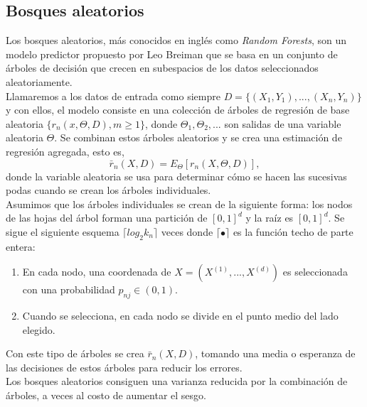 \subsection{Bosques aleatorios}
Los bosques aleatorios, más conocidos en inglés como \textit{Random Forests}, son un modelo predictor propuesto por Leo Breiman que se basa en un conjunto de  árboles de decisión que crecen en subespacios de los datos seleccionados aleatoriamente. \cite{biau2012analysis}\\
Llamaremos a los datos de entrada como siempre $D = \lbrace (X_1,Y_1),...,(X_n,Y_n) \rbrace$ y con ellos, el modelo consiste en una colección de árboles de regresión de base aleatoria $\lbrace r_n(x, \Theta ,D),m\geq1 \rbrace$, donde $\Theta_1, \Theta_2,...$ son salidas de una variable aleatoria $\Theta$. Se combinan estos árboles aleatorios y se crea una estimación de regresión agregada, esto es,
\[ \bar{r}_n(X,D)=E_{\Theta}[ r_n(X, \Theta, D) ], \]
donde la variable aleatoria se usa para determinar cómo se hacen las sucesivas podas cuando se crean los árboles individuales.\\
Asumimos que los árboles individuales se crean de la siguiente forma: los nodos de las hojas del árbol forman una partición de $[0,1]^d$ y la raíz es $[0,1]^d$. Se sigue el siguiente esquema $\lceil log_2k_n \rceil$ veces donde $\lceil \bullet \rceil$ es la función techo de parte entera:
\begin{enumerate}
  \item En cada nodo, una coordenada de $X=(X^{(1)},...,X^{(d)})$ es seleccionada con una probabilidad $p_{nj} \in (0,1)$.
  \item Cuando se selecciona, en cada nodo se divide en el punto medio del lado elegido.
\end{enumerate}
Con este tipo de árboles se crea $\bar{r}_n(X,D)$, tomando una media o esperanza de las decisiones de estos árboles para reducir los errores. \cite{biau2012analysis}\\
Los bosques aleatorios consiguen una varianza reducida por la combinación de árboles, a veces al costo de aumentar el sesgo. \cite{scikit2021rf}

